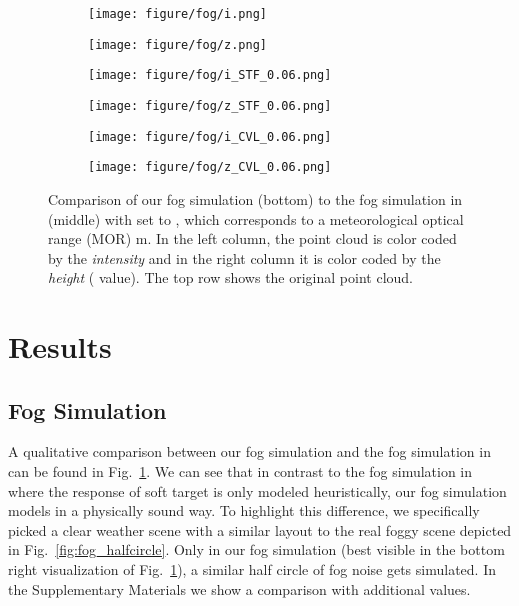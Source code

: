 \documentclass[10pt,twocolumn,letterpaper]{article}
\begin{document}
\begin{figure}
     \centering
     \begin{subfigure}[b]{0.495\linewidth}
         \centering
         \texttt{[image: figure/fog/i.png]}
     \end{subfigure}
     \hfill
     \begin{subfigure}[b]{0.495\linewidth}
         \centering
         \texttt{[image: figure/fog/z.png]}
     \end{subfigure}
     \begin{subfigure}[b]{0.495\linewidth}
         \centering
         \texttt{[image: figure/fog/i\_STF\_0.06.png]}
     \end{subfigure}
     \hfill
     \begin{subfigure}[b]{0.495\linewidth}
         \centering
         \texttt{[image: figure/fog/z\_STF\_0.06.png]}
     \end{subfigure}
     \begin{subfigure}[b]{0.495\linewidth}
         \centering
         \texttt{[image: figure/fog/i\_CVL\_0.06.png]}
     \end{subfigure}
     \hfill
     \begin{subfigure}[b]{0.495\linewidth}
         \centering
         \texttt{[image: figure/fog/z\_CVL\_0.06.png]}
     \end{subfigure}
     \caption{Comparison of our fog simulation (bottom) to the fog simulation in~\cite{STF} (middle) with  set to , which corresponds to a meteorological optical range (MOR) m. 
     In the left column, the point cloud is color coded by the \textit{intensity} and in the right column it is color coded by the \textit{height} ( value). 
     The top row shows the original point cloud.}
     \label{fig:fog_comparison}
\end{figure}
 \section{Results}
\label{sec:results}

\subsection{Fog Simulation}
\label{sec:fog_results}

A qualitative comparison between our fog simulation and the fog simulation in~\cite{STF} can be found in Fig.~\ref{fig:fog_comparison}.  We can see that in contrast to the fog simulation in~\cite{STF} where the response of soft target is only modeled heuristically, our fog simulation models  in a physically sound way. To highlight this difference, we specifically picked a clear weather scene with a similar layout to the real foggy scene depicted in Fig.~\ref{fig:fog_halfcircle}. Only in our fog simulation (best visible in the bottom right visualization of Fig.~\ref{fig:fog_comparison}), a similar half circle of fog noise gets simulated. In the Supplementary Materials we show a comparison with additional  values.
\end{document}
